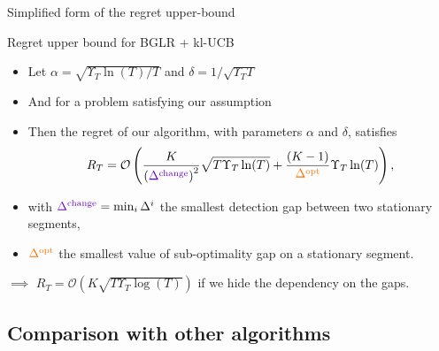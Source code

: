 \documentclass[11pt,english,ignorenonframetext,]{beamer}
\begin{document}
\begin{frame}{Simplified form of the regret upper-bound}

  \begin{block}{Regret upper bound for BGLR + kl-UCB}
    \begin{itemize}
      \item
      Let $\alpha = \sqrt{\Upsilon_T \ln(T) / T}$ and $\delta = 1 / \sqrt{\Upsilon_T T}$
      \item
      And for a problem satisfying our assumption
      \pause
      \item
      Then the regret of our algorithm, with parameters $\alpha$ and $\delta$, satisfies
      \[ R_T =\mathcal{O}\left( \frac{K}{\left(\textcolor{deeppurple}{\Delta^{\text{change}}}\right)^2}\sqrt{T \Upsilon_T \ln(T)} + \frac{(K-1)}{\textcolor{meca}{\Delta^{\text{opt}}}} \Upsilon_T\ln(T) \right),\]
      \item
      with $\textcolor{deeppurple}{\Delta^{\text{change}}} = \min_{i} \Delta^{i}$ \textcolor{deeppurple}{the smallest detection gap between two stationary segments},
      \item
      $\textcolor{meca}{\Delta^{\text{opt}}}$
      \textcolor{meca}{the smallest value of sub-optimality gap on a stationary segment}.
    \end{itemize}
  \end{block}

\pause
$\implies$ $R_T = \mathcal{O}(K \sqrt{T \Upsilon_T \log(T)})$ if we hide the dependency on the gaps.

\end{frame}


\subsection{\hfill{}Comparison with other algorithms\hfill{}}
\end{document}
